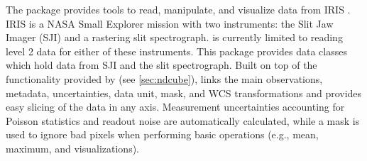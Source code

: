 The  package provides tools to read, manipulate, and visualize data from IRIS \citep{DePontieu2014}.
IRIS is a NASA Small Explorer mission with two instruments: the Slit Jaw Imager (SJI) and a rastering slit spectrograph.
 is currently limited to reading level 2 data for either of these instruments.
This package provides data classes which hold data from SJI and the slit spectrograph.
Built on top of the functionality provided by  (see \autoref{sec:ndcube}),  links the main observations, metadata, uncertainties, data unit, mask, and WCS transformations and provides easy slicing of the data in any axis.
Measurement uncertainties accounting for Poisson statistics and readout noise are automatically calculated, while a mask is used to ignore bad pixels when performing basic operations (e.g., mean, maximum, and visualizations).
